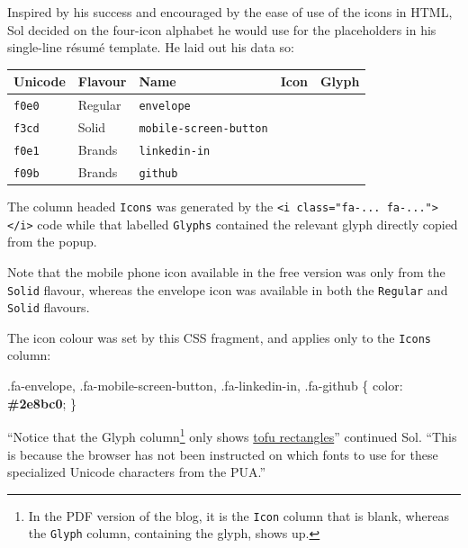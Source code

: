 \documentclass[
  british,
  a4paper,
  rgb,
  dvipsnames,
  svgnames,
  hyphens]{article}
\newenvironment{Shaded}{\begin{snugshade}}{\end{snugshade}}
\newcommand{\ConstantTok}[1]{\textcolor[rgb]{0.86,0.64,0.64}{\textbf{#1}}}
\newcommand{\FunctionTok}[1]{\textcolor[rgb]{0.94,0.94,0.56}{#1}}
\newcommand{\KeywordTok}[1]{\textcolor[rgb]{0.94,0.87,0.69}{#1}}
\newcommand{\NormalTok}[1]{\textcolor[rgb]{0.80,0.80,0.80}{#1}}
\newcommand{\OperatorTok}[1]{\textcolor[rgb]{0.94,0.94,0.82}{#1}}
\begin{document}
Inspired by his success and encouraged by the ease of use of the icons
in HTML, Sol decided on the four-icon alphabet he would use for the
placeholders in his single-line résumé template. He laid out his data
so:

\begin{longtable}[]{@{}lllcc@{}}
\toprule
Unicode & Flavour & Name & Icon & Glyph \\
\midrule
\endhead
\texttt{f0e0} & Regular & \texttt{envelope} & &
\regulariconfont \normalfont \\
\texttt{f3cd} & Solid & \texttt{mobile-screen-button} & &
\solidiconfont \normalfont \\
\texttt{f0e1} & Brands & \texttt{linkedin-in} & & \brandsiconfont 
\normalfont \\
\texttt{f09b} & Brands & \texttt{github} & & \brandsiconfont 
\normalfont \\
\bottomrule
\end{longtable}

The column headed \texttt{Icons} was generated by the
\texttt{\textless{}i\ class="fa-...\ fa-..."\textgreater{}\textless{}/i\textgreater{}}
code while that labelled \texttt{Glyphs} contained the relevant glyph
directly copied from the popup.

Note that the mobile phone icon available in the free version was only
from the \texttt{Solid} flavour, whereas the envelope icon was available
in both the \texttt{Regular} and \texttt{Solid} flavours.

The icon colour was set by this CSS fragment, and applies only to the
\texttt{Icons} column:

\begin{Shaded}
\begin{Highlighting}[]
\FunctionTok{.fa{-}envelope}\OperatorTok{,} \FunctionTok{.fa{-}mobile{-}screen{-}button}\OperatorTok{,} \FunctionTok{.fa{-}linkedin{-}in}\OperatorTok{,} \FunctionTok{.fa{-}github}\NormalTok{ \{}
  \KeywordTok{color}\NormalTok{: }\ConstantTok{\#2e8bc0}\OperatorTok{;}
\NormalTok{\}}
\end{Highlighting}
\end{Shaded}

``Notice that the Glyph column\footnote{In the PDF version of the blog,
  it is the \texttt{Icon} column that is blank, whereas the
  \texttt{Glyph} column, containing the glyph, shows up.} only shows
\href{https://en.wikipedia.org/wiki/Noto_fonts\#Origin_of_Noto_name}{tofu
rectangles}'' continued Sol. ``This is because the browser has not been
instructed on which fonts to use for these specialized Unicode
characters from the PUA.''
\end{document}
